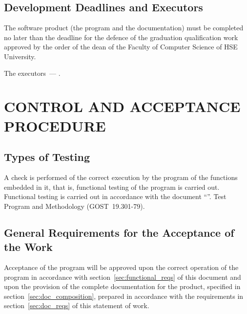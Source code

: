 \documentclass[12pt,a4paper]{extarticle}
\begin{document}
\subsection{Development Deadlines and Executors}

The software product (the program and the documentation) must be completed no later than the deadline for the defence of the graduation qualification work approved by the order of the dean of the Faculty of Computer Science of HSE University.

The executors~--- \hseAuthorsList.

\clearpage

\section{CONTROL AND ACCEPTANCE PROCEDURE}

\subsection{Types of Testing}

A check is performed of the correct execution by the program of the functions embedded in it, that is, functional testing of the program is carried out. Functional testing is carried out in accordance with the document \enquote{\projectname}. Test Program and Methodology (GOST~19.301-79).

\subsection{General Requirements for the Acceptance of the Work}

Acceptance of the program will be approved upon the correct operation of the program in accordance with section~\ref{sec:functional_reqs} of this document and upon the provision of the complete documentation for the product, specified in section~\ref{sec:doc_composition}, prepared in accordance with the requirements in section~\ref{sec:doc_reqs} of this statement of work.

\clearpage
\pagestyle{appendix}

\end{document}
